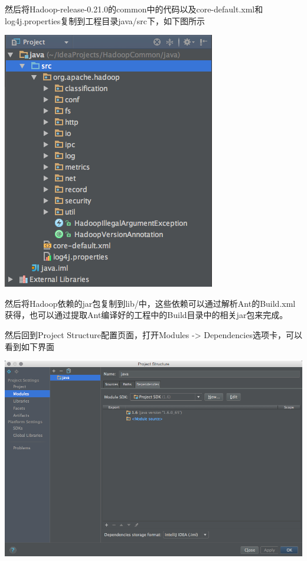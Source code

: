 然后将Hadoop-release-0.21.0的common中的代码以及core-default.xml和log4j.properties复制到工程目录java/src下，如下图所示

\includegraphics[width=\textwidth]{image/env/cr26.png}

然后将Hadoop依赖的jar包复制到lib/中，这些依赖可以通过解析Ant的Build.xml获得，也可以通过提取Ant编译好的工程中的Build目录中的相关jar包来完成。

然后回到Project Structure配置页面，打开Modules -> Dependencies选项卡，可以看到如下界面

\includegraphics[width=\textwidth]{image/env/cr27.png}

